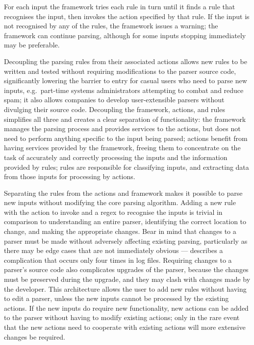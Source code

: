 For each input the framework tries each rule in turn until it finds a rule
that recognises the input, then invokes the action specified by that rule.
If the input is not recognised by any of the rules, the framework issues a
warning; the framework can continue parsing, although for some inputs
stopping immediately may be preferable.

\label{why separate rules, actions, and framework?}

Decoupling the parsing rules from their associated actions allows new rules
to be written and tested without requiring modifications to the parser
source code, significantly lowering the barrier to entry for casual users
who need to parse new inputs, e.g.\ part-time systems administrators
attempting to combat and reduce spam; it also allows companies to develop
user-extensible parsers without divulging their source code.  Decoupling
the framework, actions, and rules simplifies all three and creates a clear
separation of functionality: the framework manages the parsing process and
provides services to the actions, but does not need to perform anything
specific to the input being parsed; actions benefit from having services
provided by the framework, freeing them to concentrate on the task of
accurately and correctly processing the inputs and the information provided
by rules; rules are responsible for classifying inputs, and extracting data
from those inputs for processing by actions.

Separating the rules from the actions and framework makes it possible to
parse new inputs without modifying the core parsing algorithm.  Adding a
new rule with the action to invoke and a regex to recognise the inputs is
trivial in comparison to understanding an entire parser, identifying the
correct location to change, and making the appropriate changes.  Bear in
mind that changes to a parser must be made without adversely affecting
existing parsing, particularly as there may be edge cases that are not
immediately obvious --- 
describes a complication that occurs only four times in \numberOFlogFILES{}
log files.  Requiring changes to a parser's source code also complicates
upgrades of the parser, because the changes must be preserved during the
upgrade, and they may clash with changes made by the developer.  This
architecture allows the user to add new rules without having to edit a
parser, unless the new inputs cannot be processed by the existing actions.
If the new inputs do require new functionality, new actions can be added to
the parser without having to modify existing actions; only in the rare
event that the new actions need to cooperate with existing actions will
more extensive changes be required.


